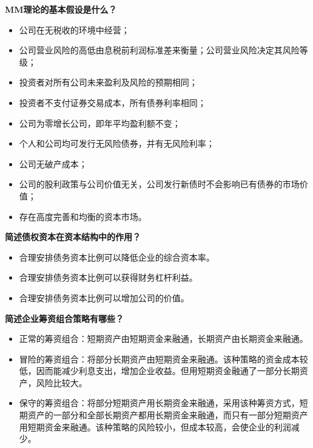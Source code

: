 \documentclass[
  10pt,
  twoside,
  openany,
  b5paper, %
  colorscheme = black, %
  xits = false,
]{qyxf-book}
\begin{document}
 \textbf{MM理论的基本假设是什么？}
\begin{note}
	\begin{itemize}
		\item 公司在无税收的环境中经营；
		\item 公司营业风险的高低由息税前利润标准差来衡量；公司营业风险决定其风险等级；
		\item 投资者对所有公司未来盈利及风险的预期相同；
		\item 投资者不支付证券交易成本，所有债券利率相同；
		\item 公司为零增长公司，即年平均盈利额不变；
		\item 个人和公司均可发行无风险债券，并有无风险利率；
		\item 公司无破产成本；
		\item 公司的股利政策与公司价值无关，公司发行新债时不会影响已有债券的市场价值；
		\item 存在高度完善和均衡的资本市场。
	\end{itemize}
\end{note}

 \textbf{简述债权资本在资本结构中的作用？}
\begin{note}
	\begin{itemize}
		\item 合理安排债务资本比例可以降低企业的综合资本率。
		\item 合理安排债务资本比例可以获得财务杠杆利益。
		\item 合理安排债务资本比例可以增加公司的价值。
	\end{itemize}
\end{note}

\newpage

 \textbf{简述企业筹资组合策略有哪些？}
\begin{note}
	\begin{itemize}
		\item 正常的筹资组合：短期资产由短期资金来融通，长期资产由长期资金来融通。
		\item 冒险的筹资组合：将部分长期资产由短期资金来融通。该种策略的资金成本较低，因而能减少利息支出，增加企业收益。但用短期资金融通了一部分长期资产，风险比较大。
		\item 保守的筹资组合：将部分短期资产用长期资金来融通，采用该种筹资方式，短期资产的一部分和全部长期资产都用长期资金来融通，而只有一部分短期资产用短期资金来融通。该种策略的风险较小，但成本较高，会使企业的利润减少。
	\end{itemize}
\end{note}
\end{document}
